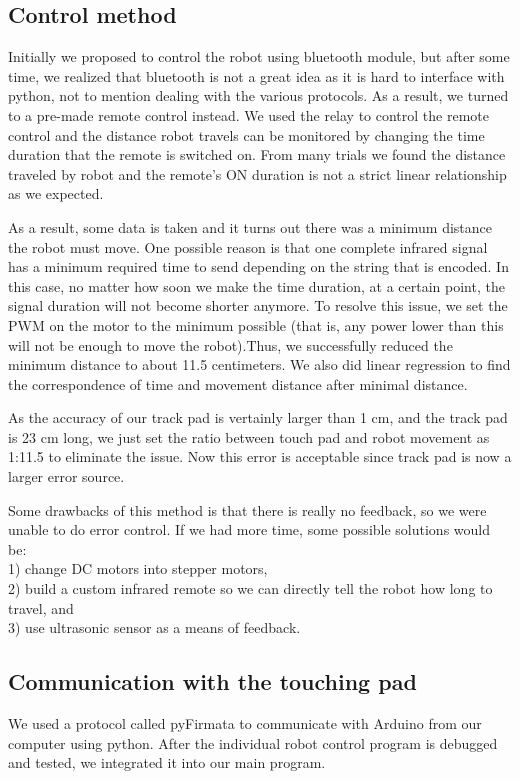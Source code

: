 \documentclass[reprint,amsmath, amsfonts, amssymb, aps, letterpaper]{revtex4-1}
\begin{document}
\subsection{Control method}
Initially we proposed to control the robot using bluetooth module, but after some time, we realized that bluetooth is not a great idea as it is hard to interface with python, not to mention dealing with the various protocols. As a result, we turned to a pre-made remote control instead. We used the relay to control the remote control and the distance robot travels can be monitored by changing the time duration that the remote is switched on. From many trials we found the distance traveled by robot and the remote's ON duration is not a strict linear relationship as we expected. 

As a result, some data is taken and it turns out there was a minimum distance the robot must move. One possible reason is that one complete infrared signal has a minimum required time to send depending on the string that is encoded. In this case, no matter how soon we make the time duration, at a certain point, the signal duration will not become shorter anymore. To resolve this issue, we set the PWM on the motor to the minimum possible (that is, any power lower than this will not be enough to move the robot).Thus, we successfully reduced the minimum distance to about 11.5 centimeters. We also did linear regression to find the correspondence of time and movement distance after minimal distance.

As the accuracy of our track pad is vertainly larger than 1 cm, and the track pad is 23 cm long, we just set the ratio between touch pad and robot movement as 1:11.5 to eliminate the issue. Now this error is acceptable since track pad is now a larger error source.

Some drawbacks of this method is that there is really no feedback, so we were unable to do error control. If we had more time, some possible solutions would be: \\
1) change DC motors into stepper motors, \\
2) build a custom infrared remote so we can directly tell the robot how long to travel, and \\
3) use ultrasonic sensor as a means of feedback.
\subsection{Communication with the touching pad}
We used a protocol called pyFirmata to communicate with Arduino from our computer using python. After the individual robot control program is debugged and tested, we integrated it into our main program.
\end{document}
